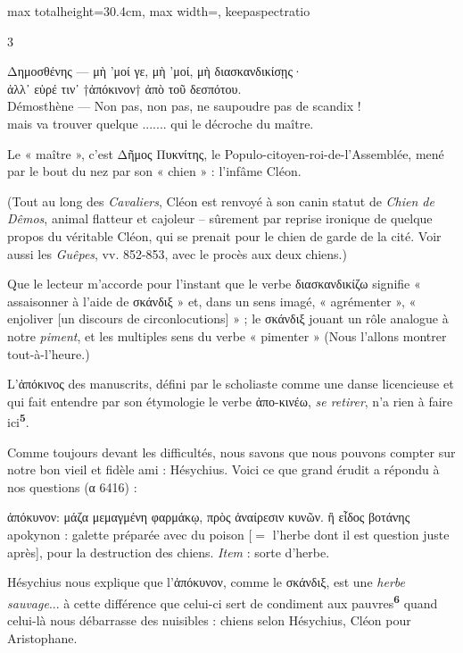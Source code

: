 \documentclass[11pt,twoside]{book}
\newcommand{\italique}[1]{\textit{#1}}
\newcommand{\citComm}[1]{\begin{quoting}[vskip=0.4pt,leftmargin=0.7em,rightmargin=0.2em]#1\end{quoting}}
\newcommand{\marqueur}[1]{\textsuperscript{\color{rubricRed}\textbf{#1}}}
\begin{document}
\begin{adjustbox}{max totalheight=30.4cm, max width=\textwidth, keepaspectratio}
\begin{minipage}{\textwidth}
{\begin{multicols}{3}
\citComm{Δημοσθένης --- μὴ 'μοί γε, μὴ 'μοί, μὴ διασκανδικίσῃς·\\
ἀλλ᾽ εὑρέ τιν᾽ †ἀπόκινον† ἀπὸ τοῦ δεσπότου.\\
Démosthène --- Non pas, non pas, ne saupoudre pas de scandix !\\
mais va trouver quelque .......  qui le décroche du maître.}
\par\vspace{1.5pt}
\noindent Le « maître », c'est Δῆμος Πυκνίτης, le Populo-citoyen-roi-de-l'Assemblée, mené par le bout du nez par son « chien » : l'infâme Cléon.
\par\vspace{1.5pt}
\noindent (Tout au long des \italique{Cavaliers}, Cléon est renvoyé à son canin statut de \italique{Chien de Dêmos}, animal flatteur et cajoleur – sûrement par reprise ironique de quelque propos du véritable Cléon, qui se prenait pour le chien de garde de la cité. Voir aussi les \italique{Guêpes}, vv. 852-853, avec le procès aux deux chiens.)
\par\vspace{1.5pt}
\noindent Que le lecteur m'accorde pour l'instant que le verbe διασκανδικίζω signifie « assaisonner à l'aide de σκάνδιξ » et, dans un sens imagé, « agrémenter », « enjoliver [un discours de circonlocutions] » ; le σκάνδιξ jouant un rôle analogue à notre \italique{piment}, et les multiples sens du verbe « pimenter » (Nous l'allons montrer tout-à-l'heure.)
\par\vspace{1.5pt}
\noindent L'ἀπόκινος des manuscrits, défini par le scholiaste comme une danse licencieuse et qui fait entendre par son étymologie le verbe ἀπο-κινέω, \italique{se retirer}, n'a rien à faire ici\marqueur{5}.
\par\vspace{1.5pt}
\noindent Comme toujours devant les difficultés, nous savons que nous pouvons compter sur notre bon vieil et fidèle ami : Hésychius. Voici ce que grand érudit a répondu à nos questions (α 6416) :
\citComm{ἀπόκυνον: μάζα μεμαγμένη φαρμάκῳ, πρὸς ἀναίρεσιν κυνῶν. ἢ εἶδος βοτάνης\\
apokynon : galette préparée avec du poison [$=$ l'herbe dont il est question juste après], pour la destruction des chiens. \italique{Item} : sorte d'herbe.}
\par\vspace{1.5pt}
\noindent Hésychius nous explique que l'ἀπόκυνον, comme le σκάνδιξ, est une \italique{herbe sauvage}... à cette différence que celui-ci sert de condiment aux pauvres\marqueur{6} quand celui-là nous débarrasse des nuisibles : chiens selon Hésychius, Cléon pour Aristophane.

\end{multicols}}
\end{minipage}
\end{adjustbox}
\end{document}
